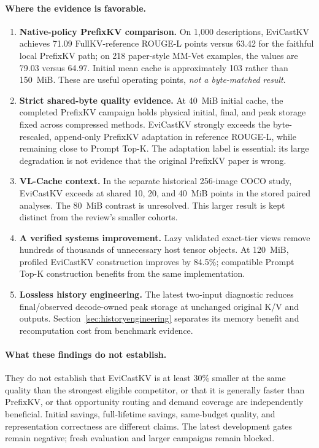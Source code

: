\documentclass[10pt,letterpaper]{article}
\newcommand{\Evi}{EviCastKV}
\begin{document}
\paragraph{Where the evidence is favorable.}
\begin{enumerate}
\item \textbf{Native-policy PrefixKV comparison.} On 1,000 descriptions,
\Evi{} achieves 71.09 FullKV-reference ROUGE-L points versus 63.42 for the
faithful local PrefixKV path; on 218 paper-style MM-Vet examples, the values
are 79.03 versus 64.97. Initial mean cache is approximately 103 rather than
150~MiB. These are useful operating points, \emph{not a byte-matched result}.
\item \textbf{Strict shared-byte quality evidence.} At 40~MiB initial cache,
the completed PrefixKV campaign holds physical initial, final, and peak
storage fixed across compressed methods. \Evi{} strongly exceeds the
byte-rescaled, append-only PrefixKV adaptation in reference ROUGE-L, while
remaining close to Prompt Top-K. The adaptation label is essential: its
large degradation is not evidence that the original PrefixKV paper is wrong.
\item \textbf{VL-Cache context.} In the separate historical 256-image COCO
study, \Evi{} exceeds  at shared 10, 20, and 40~MiB
points in the stored paired analyses. The 80~MiB contrast is unresolved.
This larger result is kept distinct from the review's smaller cohorts.
\item \textbf{A verified systems improvement.} Lazy validated exact-tier
views remove hundreds of thousands of unnecessary host tensor objects.
At 120~MiB, profiled \Evi{} construction improves by 84.5\%; compatible
Prompt Top-K construction benefits from the same implementation.
\item \textbf{Lossless history engineering.} The latest two-input diagnostic
reduces final/observed decode-owned peak storage at unchanged original K/V
and outputs. Section~\ref{sec:historyengineering} separates its memory benefit
and recomputation cost from benchmark evidence.
\end{enumerate}

\paragraph{What these findings do not establish.}
They do not establish that \Evi{} is at least 30\% smaller at the same
quality than the strongest eligible competitor, or that it is generally
faster than PrefixKV, or that opportunity routing and demand coverage are
independently beneficial. Initial savings, full-lifetime savings,
same-budget quality, and representation correctness are different claims.
The latest development gates remain negative; fresh evaluation and larger
campaigns remain blocked.
\end{document}
